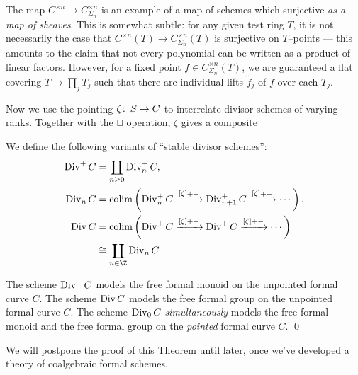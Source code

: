 \begin{remark}
The map $C^{\times n} \to C^{\times n}_{\Sigma_n}$ is an example of a map of schemes which surjective \emph{as a map of sheaves}.  This is somewhat subtle: for any given test ring $T$, it is not necessarily the case that $C^{\times n}(T) \to C^{\times n}_{\Sigma_n}(T)$ is surjective on $T$--points --- this amounts to the claim that not every polynomial can be written as a product of linear factors.  However, for a fixed point $f \in C^{\times n}_{\Sigma_n}(T)$, we are guaranteed a flat covering $T \to \prod_j T_j$ such that there are individual lifts $\widetilde f_j$ of $f$ over each $T_j$.
\end{remark}

Now we use the pointing $\zeta\colon\thinspace S \to C$ to interrelate divisor schemes of varying ranks.  Together with the $\sqcup$ operation, $\zeta$ gives a composite
\begin{center}
\end{center}

\begin{definition}\label{StableDivisorSchemeDefn}
We define the following variants of ``stable divisor schemes'':
\begin{align*}
\Div^+ C & = \coprod_{n \ge 0} \Div_n^+ C, \\
\Div_n C & = \colim \left( \Div_n^+ C \xrightarrow{[\zeta] + -} \Div_{n+1}^+ C \xrightarrow{[\zeta] + -} \cdots \right), \\
\Div C & = \colim \left( \Div^+ C \xrightarrow{[\zeta] + -} \Div^+ C \xrightarrow{[\zeta] + -} \cdots \right) \\
& \cong \coprod_{n \in \Z} \Div_n C.
\end{align*}
\end{definition}

\begin{theorem}\label{DivConstructionsAreFree}
The scheme $\operatorname{Div}^+ C$ models the free formal monoid on the unpointed formal curve $C$.  The scheme $\operatorname{Div} C$ models the free formal group on the unpointed formal curve $C$.  The scheme $\operatorname{Div}_0 C$ \emph{simultaneously} models the free formal monoid and the free formal group on the \emph{pointed} formal curve $C$. \qed
\end{theorem}
\noindent We will postpone the proof of this Theorem until later, once we've developed a theory of coalgebraic formal schemes.

